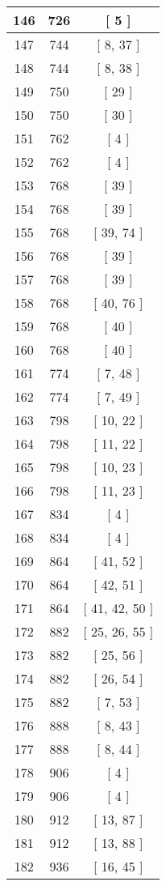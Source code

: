 \begin{center}
\begin{longtable}[H]{|| c c c ||}
146 & 726 & [ 5 ] \\ 
\hline
147 & 744 & [ 8, 37 ] \\ 
\hline
148 & 744 & [ 8, 38 ] \\ 
\hline
149 & 750 & [ 29 ] \\ 
\hline
150 & 750 & [ 30 ] \\ 
\hline
151 & 762 & [ 4 ] \\ 
\hline
152 & 762 & [ 4 ] \\ 
\hline
153 & 768 & [ 39 ] \\ 
\hline
154 & 768 & [ 39 ] \\ 
\hline
155 & 768 & [ 39, 74 ] \\ 
\hline
156 & 768 & [ 39 ] \\ 
\hline
157 & 768 & [ 39 ] \\ 
\hline
158 & 768 & [ 40, 76 ] \\ 
\hline
159 & 768 & [ 40 ] \\ 
\hline
160 & 768 & [ 40 ] \\ 
\hline
161 & 774 & [ 7, 48 ] \\ 
\hline
162 & 774 & [ 7, 49 ] \\ 
\hline
163 & 798 & [ 10, 22 ] \\ 
\hline
164 & 798 & [ 11, 22 ] \\ 
\hline
165 & 798 & [ 10, 23 ] \\ 
\hline
166 & 798 & [ 11, 23 ] \\ 
\hline
167 & 834 & [ 4 ] \\ 
\hline
168 & 834 & [ 4 ] \\ 
\hline
169 & 864 & [ 41, 52 ] \\ 
\hline
170 & 864 & [ 42, 51 ] \\ 
\hline
171 & 864 & [ 41, 42, 50 ] \\ 
\hline
172 & 882 & [ 25, 26, 55 ] \\ 
\hline
173 & 882 & [ 25, 56 ] \\ 
\hline
174 & 882 & [ 26, 54 ] \\ 
\hline
175 & 882 & [ 7, 53 ] \\ 
\hline
176 & 888 & [ 8, 43 ] \\ 
\hline
177 & 888 & [ 8, 44 ] \\ 
\hline
178 & 906 & [ 4 ] \\ 
\hline
179 & 906 & [ 4 ] \\ 
\hline
180 & 912 & [ 13, 87 ] \\ 
\hline
181 & 912 & [ 13, 88 ] \\ 
\hline
182 & 936 & [ 16, 45 ] \\ 

\end{longtable}
\end{center}
